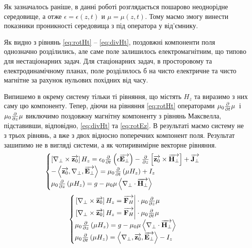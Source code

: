 Як зазначалось раніше, в данні роботі розглядається пошарово неоднорідне 
середовище, а отже $ \epsilon = \epsilon(z,t) $ и $ \mu = \mu(z,t) $. Тому
маємо змогу винести показники проникності середовища з під оператора у 
від'ємнику.

Як видно з рівнянь \eqref{eq:rotHt} -- \eqref{eq:divHt}, поздовжні компоненти 
поля однозначно розділились, але саме поле залишилось електромагнітним, що 
типово для нестаціонарних задач. Для стаціонарних задач, в просторовому та 
електродинамічному планах, поле розділилось б на чисто електричне та чисто
магнітне за рахунок нульових похідних від часу.

Випишемо в окрему систему тільки ті рівняння, що містять $ H_z $ та виразимо з 
них саму цю компоненту. Тепер, діючи на рівняння \eqref{eq:rotHt} операторами 
$ \mu_0 \frac{\partial }{\partial t} \mu $ і $ \mu_0 \frac{\partial }{\partial z} \mu $ виключимо поздовжну 
магнітну компоненту з рівнянь Максвелла, підставивши, відповідно, 
\eqref{eq:divHt} та \eqref{eq:rotEz}. В результаті маємо систему не з трьох 
рівнянь, а вже з двох відносно поперечних компонент поля. Результат зашипимо не 
в вигляді системи, а як чотиривимірне векторне рівняння.
%
\textcolor{lightgray}{ \begin{equation*} \begin{aligned}
\begin{cases} 
\left[ \nabla_\perp \times \overrightarrow{\mathbf z_0} \right] H_z =
\epsilon_0 \frac{\partial }{\partial t} \left( \epsilon \overrightarrow{\mathbf E_\perp} \right) -
\frac{\partial }{\partial z} \left[ \overrightarrow{\mathbf z_0} \times \overrightarrow{\mathbf H_\perp} \right] + \overrightarrow{\mathbf J_\perp} \\
- \left< \overrightarrow{\mathbf z_0} , \nabla_\perp , \overrightarrow{\mathbf E_\perp} \right> =
\mu_0 \frac{\partial }{\partial t} \left(\mu H_z \right) + I_z \\ 
\mu_0 \frac{\partial }{\partial z} \left( \mu H_z \right) = 
g - \mu_0 \mu \left< \nabla_\perp \cdot \overrightarrow{\mathbf H_\perp} \right>
\end{cases}
\end{aligned} \end{equation*} }
%
\textcolor{lightgray}{ \begin{equation*} \begin{aligned}
\begin{cases} 
\left. \left[ \nabla_\perp \times \overrightarrow{\mathbf z_0} \right] H_z = \overrightarrow{\mathbf F_H} 
\right| \cdot \mu_0 \frac{\partial }{\partial z} \mu \\
\left. \left[ \nabla_\perp \times \overrightarrow{\mathbf z_0} \right] H_z = \overrightarrow{\mathbf F_H} 
\right| \cdot \mu_0 \frac{\partial }{\partial t} \mu \\
\mu_0 \frac{\partial }{\partial z} \left( \mu H_z \right) = 
g - \mu_0 \mu \left< \nabla_\perp \cdot \overrightarrow{\mathbf H_\perp} \right> \\
\mu_0 \frac{\partial }{\partial t} \left(\mu H_z \right) =
\left< \nabla_\perp , \overrightarrow{\mathbf z_0} , \overrightarrow{\mathbf E_\perp} \right> - I_z
\end{cases}
\end{aligned} \end{equation*} }
